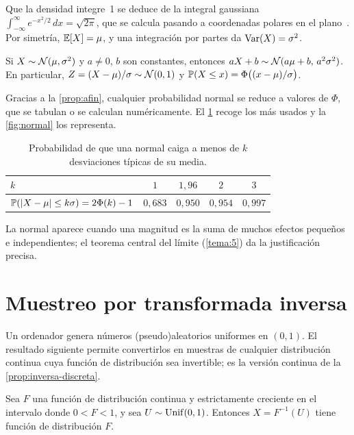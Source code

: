 Que la densidad integre~1 se deduce de la integral gaussiana $\int_{-\infty}^{\infty}e^{-x^{2}/2}\,dx=\sqrt{2\pi}$, que se calcula pasando a coordenadas polares en el plano~\cite[§3.3]{bt}. Por simetría, $\mathbb{E}[X]=\mu$, y una integración por partes da $\operatorname{Var}(X)=\sigma^{2}$.

\begin{proposicion}\label{prop:afin}
Si $X\sim\mathcal{N}(\mu,\sigma^{2})$ y $a\ne 0$, $b$ son constantes, entonces $aX+b\sim\mathcal{N}(a\mu+b,\,a^{2}\sigma^{2})$. En particular, $Z=(X-\mu)/\sigma\sim\mathcal{N}(0,1)$ y $\mathbb{P}(X\le x)=\Phi\bigl((x-\mu)/\sigma\bigr)$.
\end{proposicion}

Gracias a la \cref{prop:afin}, cualquier probabilidad normal se reduce a valores de $\Phi$, que se tabulan o se calculan numéricamente. El \cref{tab:normal} recoge los más usados y la \cref{fig:normal} los representa.

\begin{table}[h]
\centering\small
\caption{Probabilidad de que una normal caiga a menos de $k$ desviaciones típicas de su media.}\label{tab:normal}
\begin{tabular}{@{}lcccc@{}}
\toprule
$k$ & $1$ & $1{,}96$ & $2$ & $3$ \\
\midrule
$\mathbb{P}(\lvert X-\mu\rvert\le k\sigma)=2\Phi(k)-1$ & $0{,}683$ & $0{,}950$ & $0{,}954$ & $0{,}997$ \\
\bottomrule
\end{tabular}
\end{table}

\addtocounter{figure}{1}%

\addtocounter{definicion}{1}%

La normal aparece cuando una magnitud es la suma de muchos efectos pequeños e independientes; el teorema central del límite (\cref{tema:5}) da la justificación precisa.

\section{Muestreo por transformada inversa}

Un ordenador genera números (pseudo)aleatorios uniformes en $(0,1)$. El resultado siguiente permite convertirlos en muestras de cualquier distribución continua cuya función de distribución sea invertible; es la versión continua de la \cref{prop:inversa-discreta}.

\begin{teorema}\label{teo:inversa}
Sea $F$ una función de distribución continua y estrictamente creciente en el intervalo donde $0<F<1$, y sea $U\sim\operatorname{Unif}(0,1)$. Entonces $X=F^{-1}(U)$ tiene función de distribución $F$.
\end{teorema}

